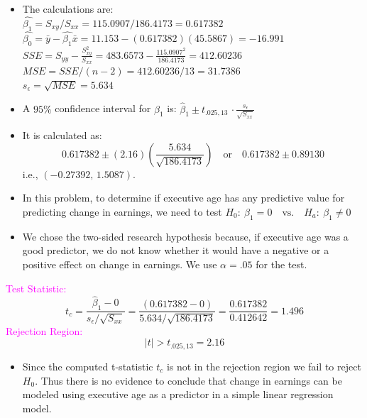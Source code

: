 \documentclass[xcolor=dvipsnames,12pt]{beamer}
\begin{document}
\begin{frame}
\begin{itemize}
\item The calculations are:\\
$\hat{\beta_1} =S_{xy}/S_{xx} = 115.0907/186.4173=0.617382$\\
$\hat{\beta_0} = \bar{y}-\hat{\beta_1}
                    \bar{x}=11.153-(0.617382)(45.5867)=-16.991$\\
$SSE  = S_{yy}-\frac{S_{xy}^2}{S_{xx}}=483.6573-\frac{
115.0907^2}{186.4173}=412.60236$\\
$MSE   = SSE  /(n-2)=412.60236/13=31.7386$\\
$s_\epsilon=\sqrt{MSE}=5.634$
\item A $95\%$ confidence interval for $\beta_1$ is: \quad
$\hat{\beta}_1 \pm t_{.025,13}\,\cdot \frac{s_{\epsilon}}{\sqrt{S_{xx}}}$\\
\end{itemize}
\end{frame}


\begin{frame}
\begin{itemize}
\item It is calculated as:
$$
0.617382 \pm (2.16)(\frac{5.634}{\sqrt{186.4173}})\quad \mbox{or} \quad 
0.617382 \pm 0.89130
$$
i.e., $(-0.27392,\,1.5087)$.\\[.1in]
\item In this problem, to determine if executive age has any predictive
value for predicting change in earnings, we need to test 
\hspace{2in} $ H_0:\ \beta_1=0 \quad \mbox{vs.} \quad  H_a:\ \beta_1 \neq 0$\\[.1in]
\item We chose the two-sided research hypothesis because, if executive age
was a good predictor, we do not know whether it would have a
negative or a positive effect on  change in earnings. We use 
$\alpha=.05$ for the test.
\end{itemize}
\end{frame}


\begin{frame}
\textcolor{magenta}{Test Statistic:} 
 $$ t_c = \frac{\hat{\beta}_1-0}{s_\epsilon/\sqrt{S_{xx}}}=
\frac{(0.617382-0)}{5.634/\sqrt{186.4173}}=\frac{0.617382}{0.412642}=1.496$$
{\textcolor{magenta}{Rejection Region:}}
$$|t|> t_{.025,13}=2.16$$
\begin{itemize}
\item Since the computed t-statistic $t_c$ is not in the rejection region
we fail to reject $ H_0$. Thus there is no evidence to conclude that
change in earnings can be modeled using executive age as a predictor in a simple linear
regression model. 
\end{itemize}
\end{frame}
\end{document}

